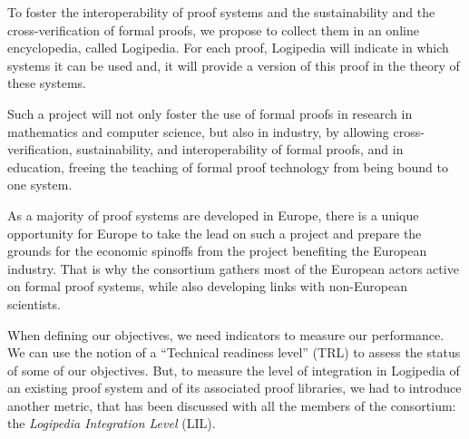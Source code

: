 To foster the interoperability of proof systems and the sustainability
and the cross-verification of formal proofs, we propose to collect
them in an online encyclopedia, called Logipedia.  For each proof,
Logipedia will indicate in which systems it can be used and, it will
provide a version of this proof in the theory of these systems.

Such a project will not only foster the use of formal proofs in
research in mathematics and computer science, but also in industry, by
allowing cross-verification, sustainability, and interoperability of
formal proofs, and in education, freeing the teaching of formal proof
technology from being bound to one system.

As a
majority of proof systems are developed in Europe, there is a unique
opportunity for Europe to take the lead on such a project and prepare
the grounds for the economic spinoffs from the project benefiting
the European industry. That is why the consortium gathers most of the
European actors active on formal proof systems, while also developing
links with non-European scientists.

When defining our objectives, we need indicators to measure our
performance.  We can use the notion of a ``Technical readiness level''
(TRL) to assess the status of some of our objectives.  But, to measure
the level of integration in Logipedia of an existing proof system and
of its associated proof libraries, we had to introduce another
metric, that has been discussed with all the members of the consortium:
the {\em Logipedia Integration Level} (LIL).

